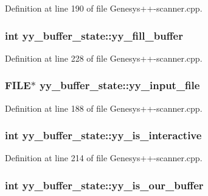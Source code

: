 Definition at line 190 of file Genesys++-\/scanner.\-cpp.

\hypertarget{structyy__buffer__state_a63d2afbb1d79a3fc63df9e12626f827d}{
\subsubsection[{yy\-\_\-fill\-\_\-buffer}]{\setlength{\rightskip}{0pt plus 5cm}int yy\-\_\-buffer\-\_\-state\-::yy\-\_\-fill\-\_\-buffer}}\label{structyy__buffer__state_a63d2afbb1d79a3fc63df9e12626f827d}


Definition at line 228 of file Genesys++-\/scanner.\-cpp.

\hypertarget{structyy__buffer__state_a4843d1422e3276b636d475a3095bd948}{
\subsubsection[{yy\-\_\-input\-\_\-file}]{\setlength{\rightskip}{0pt plus 5cm}F\-I\-L\-E$\ast$ yy\-\_\-buffer\-\_\-state\-::yy\-\_\-input\-\_\-file}}\label{structyy__buffer__state_a4843d1422e3276b636d475a3095bd948}


Definition at line 188 of file Genesys++-\/scanner.\-cpp.

\hypertarget{structyy__buffer__state_abf5c70eea75581b58c0ee7bd31b14490}{
\subsubsection[{yy\-\_\-is\-\_\-interactive}]{\setlength{\rightskip}{0pt plus 5cm}int yy\-\_\-buffer\-\_\-state\-::yy\-\_\-is\-\_\-interactive}}\label{structyy__buffer__state_abf5c70eea75581b58c0ee7bd31b14490}


Definition at line 214 of file Genesys++-\/scanner.\-cpp.

\hypertarget{structyy__buffer__state_a80ce2431c70dc4f89ced487f18449465}{
\subsubsection[{yy\-\_\-is\-\_\-our\-\_\-buffer}]{\setlength{\rightskip}{0pt plus 5cm}int yy\-\_\-buffer\-\_\-state\-::yy\-\_\-is\-\_\-our\-\_\-buffer}}\label{structyy__buffer__state_a80ce2431c70dc4f89ced487f18449465}


